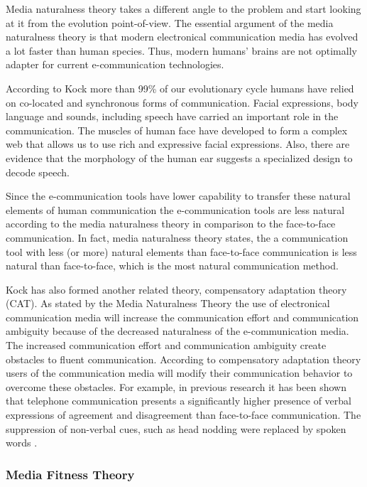 \documentclass[english,12pt,a4paper,pdftex]{article}
\begin{document}
Media naturalness theory takes a different angle to the problem and start looking at it from the evolution point-of-view. The essential argument of the media naturalness theory is that modern electronical communication media has evolved a lot faster than human species. Thus, modern humans' brains are not optimally adapter for current e-communication technologies. \citep{kock2005}

According to Kock more than 99\% of our evolutionary cycle humans have relied on co-located and synchronous forms of communication. Facial expressions, body language and sounds, including speech have carried an important role in the communication. The muscles of human face have developed to form a complex web that allows us to use rich and expressive facial expressions. Also, there are evidence that the morphology of the human ear suggests a specialized design to decode speech. \citep{kock2005}

Since the e-communication tools have lower capability to transfer these natural elements of human communication the e-communication tools are less natural according to the media naturalness theory in comparison to the face-to-face communication. In fact, media naturalness theory states, the a communication tool with less (or more) natural elements than face-to-face communication is less natural than face-to-face, which is the most natural communication method. \citep{kock2005} \citep{kock2004}

Kock has also formed another related theory, compensatory adaptation theory (CAT). As stated by the Media Naturalness Theory the use of electronical communication media will increase the communication effort and communication ambiguity because of the decreased naturalness of the e-communication media. The increased communication effort and communication ambiguity create obstacles to fluent communication. According to compensatory adaptation theory users of the communication media will modify their communication behavior to overcome these obstacles. For example, in previous research it has been shown that telephone communication presents a significantly higher presence of verbal expressions of agreement and disagreement than face-to-face communication. The suppression of non-verbal cues, such as head nodding were replaced by spoken words \citep{kock2007}.

\subsubsection{Media Fitness Theory}
\end{document}
